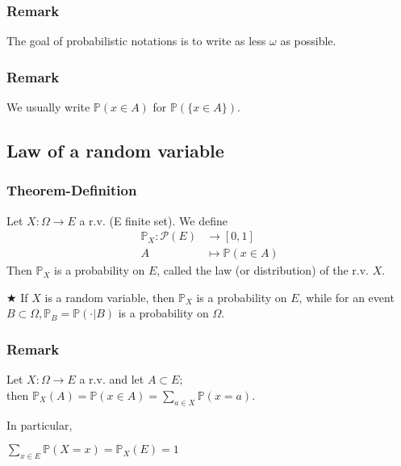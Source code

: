             \subsubsection{Remark}
                The goal of probabilistic notations is to write as less $\omega$ as possible.

            \subsubsection{Remark}
                We usually write $\mathbb{P}(x\in A)$ for $\mathbb{P}(\{x\in A\})$.

        \vspace{30pt}

        \subsection{Law of a random variable}
            \subsubsection{Theorem-Definition}
                Let $X:\Omega\rightarrow E$ a r.v. (E finite set). We define \begin{align*}
                    \mathbb{P}_X: \mathcal{P}(E) & \rightarrow [0,1] \\
                    A & \mapsto \mathbb{P}(x \in A)
                \end{align*}
                Then $\mathbb{P}_X$ is a probability on $E$, called the law (or distribution) of the r.v. $X$.

            $\bigstar$ If $X$ is a random variable, then $\mathbb{P}_X$ is a probability on $E$, while for an event $B \subset \Omega, \mathbb{P}_B=\mathbb{P}(\cdot | B)$ is a probability on $\Omega$.

            \subsubsection{Remark}
                Let $X:\Omega \rightarrow E$ a r.v. and let $A \subset E$; \\ then $\mathbb{P}_X(A)=\mathbb{P}(x \in A)= \displaystyle\sum_{a \in X}\mathbb{P}(x=a)$.

                \noindent In particular,

                \centerline{$\displaystyle\sum_{x\in E}\mathbb{P}(X=x) = \mathbb{P}_X (E) =1$}

                \vspace{5pt}

